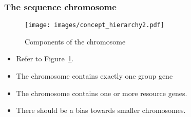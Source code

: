 \subsubsection{The sequence chromosome}
\begin{figure}[h!]
	\centering
	\texttt{[image: images/concept\_hierarchy2.pdf]}
	\caption[Components of the chromosome]{Components of the chromosome}
	\label{fig:chromosome_components}
\end{figure}
\begin{itemize}
	\item Refer to Figure~\ref{fig:chromosome_components}.
	\item The chromosome contains exactly one group gene
	\item The chromosome contains one or more resource genes.
	\item There should be a bias towards smaller chromosomes.
\end{itemize}
